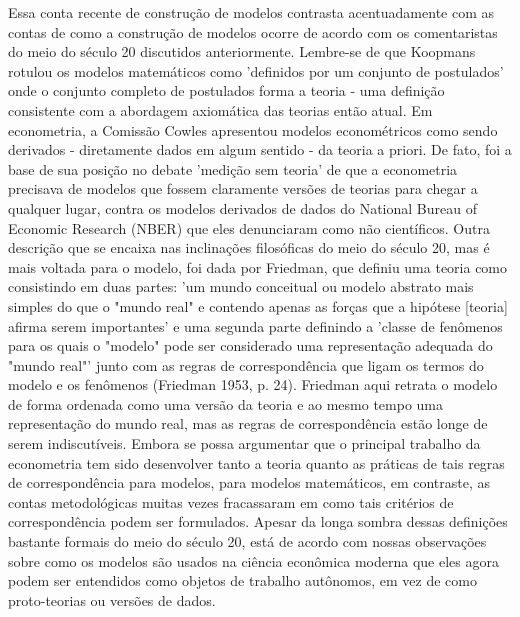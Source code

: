 \documentclass[a4paper,12pt]{article}[abntex2]
\begin{document}
Essa conta recente de construção de modelos contrasta acentuadamente com as contas de como a construção de modelos ocorre de acordo com os comentaristas do meio do século 20 discutidos anteriormente. Lembre-se de que Koopmans rotulou os modelos matemáticos como 'definidos por um conjunto de postulados' onde o conjunto completo de postulados forma a teoria - uma definição consistente com a abordagem axiomática das teorias então atual. Em econometria, a Comissão Cowles apresentou modelos econométricos como sendo derivados - diretamente dados em algum sentido - da teoria a priori. De fato, foi a base de sua posição no debate 'medição sem teoria' de que a econometria precisava de modelos que fossem claramente versões de teorias para chegar a qualquer lugar, contra os modelos derivados de dados do National Bureau of Economic Research (NBER) que eles denunciaram como não científicos. Outra descrição que se encaixa nas inclinações filosóficas do meio do século 20, mas é mais voltada para o modelo, foi dada por Friedman, que definiu uma teoria como consistindo em duas partes: 'um mundo conceitual ou modelo abstrato mais simples do que o "mundo real" e contendo apenas as forças que a hipótese [teoria] afirma serem importantes' e uma segunda parte definindo a 'classe de fenômenos para os quais o "modelo" pode ser considerado uma representação adequada do "mundo real"' junto com as regras de correspondência que ligam os termos do modelo e os fenômenos (Friedman 1953, p. 24). Friedman aqui retrata o modelo de forma ordenada como uma versão da teoria e ao mesmo tempo uma representação do mundo real, mas as regras de correspondência estão longe de serem indiscutíveis. Embora se possa argumentar que o principal trabalho da econometria tem sido desenvolver tanto a teoria quanto as práticas de tais regras de correspondência para modelos, para modelos matemáticos, em contraste, as contas metodológicas muitas vezes fracassaram em como tais critérios de correspondência podem ser formulados. Apesar da longa sombra dessas definições bastante formais do meio do século 20, está de acordo com nossas observações sobre como os modelos são usados na ciência econômica moderna que eles agora podem ser entendidos como objetos de trabalho autônomos, em vez de como proto-teorias ou versões de dados.
\end{document}
